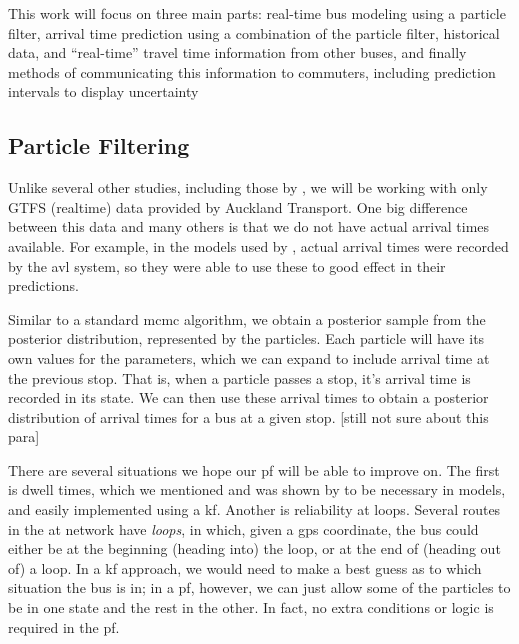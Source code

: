 \documentclass[12pt,a4paper]{article}
\begin{document}
This work will focus on three main parts:
real-time bus modeling using a particle filter,
arrival time prediction using a combination of the particle filter,
historical data, and ``real-time'' travel time information
from other buses,
and finally methods of communicating this information to commuters,
including prediction intervals
to display uncertainty



\subsection{Particle Filtering}
\label{sec:new-pf}

Unlike several other studies, including those by \cite{hans-etal:2015},
we will be working with only GTFS (realtime) data provided by Auckland Transport.
One big difference between this data and many others is that we do not have
actual arrival times available.
For example, in the models used by \cite{hans-etal:2015},
actual arrival times were recorded by the \gls{avl} system, 
so they were able to use these to good effect in their predictions.



Similar to a standard \gls{mcmc} algorithm, we obtain a posterior sample from the posterior
distribution, represented by the particles.
Each particle will have its own values for the parameters,
which we can expand to include arrival time at the previous stop.
That is, when a particle passes a stop, it's arrival time is recorded in its state.
We can then use these arrival times to obtain a posterior distribution of arrival times
for a bus at a given stop.
[still not sure about this para]



There are several situations we hope our \gls{pf} will be able to improve on.
The first is dwell times, which we mentioned and was shown by 
\cite{hans-etal:2015} to be necessary in models, and easily implemented
using a \gls{kf}.
Another is reliability at loops.
Several routes in the \gls{at} network have \emph{loops},
in which, given a \gls{gps} coordinate, the bus could either be
at the beginning (heading into) the loop, or at the end of (heading out of) a loop.
In a \gls{kf} approach, we would need to make a best guess as to which situation 
the bus is in; 
in a \gls{pf}, however, we can just allow some of the particles to be in one state
and the rest in the other.
In fact, no extra conditions or logic is required in the \gls{pf}.
\end{document}
